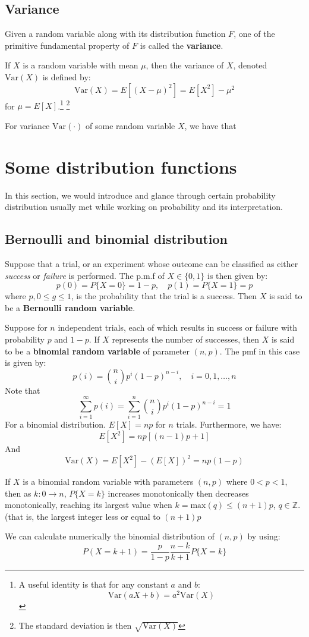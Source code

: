 \subsection{Variance}
Given a random variable along with its distribution function $F$, one of the primitive fundamental property of $F$ is called the \textbf{variance}. 
\begin{definition}[Variance]
    If $X$ is a random variable with mean $\mu$, then the variance of $X$, denoted $\mathrm{Var}(X)$ is defined by: $$\mathrm{Var}(X)=E[(X-\mu)^{2}]=E[X^{2}]-\mu^{2}$$ for $\mu=E[X]$.\footnote{A useful identity is that for any constant $a$ and $b$: $$\mathrm{Var}(aX+b)=a^{2}\mathrm{Var}(X)$$} \footnote{The standard deviation is then $\sqrt{\mathrm{Var}(X)}$}
\end{definition}
\begin{theorem}
    For variance $\mathrm{Var}(\cdot)$ of some random variable $X$, we have that 
\end{theorem}

\section{Some distribution functions}
In this section, we would introduce and glance through certain probability distribution usually met while working on probability and its interpretation.
\subsection{Bernoulli and binomial distribution}
Suppose that a trial, or an experiment whose outcome can be classified as either \textit{success} or \textit{failure} is performed. The p.m.f of $X\in\{ 0,1 \}$ is then given by: $$p(0)=P\{ X=0 \}=1-p,\quad p(1)=P\{ X=1 \}=p$$
where $p,0\leq g\leq 1$, is the probability that the trial is a success. Then $X$ is said to be a \textbf{Bernoulli random variable}. 

Suppose for $n$ independent trials, each of which results in success or failure with probability $p$ and $1-p$. If $X$ represents the number of successes, then $X$ is said to be a \textbf{binomial random variable} of parameter $(n,p)$. The pmf in this case is given by: $$p(i)={n\choose i}p^{i} (1-p)^{n-i},\quad i = 0,1,\dots,n$$
Note that $$\sum^{\infty}_{i=1}p(i)=\sum^{n}_{i=1}{n\choose i}p^{i}(1-p)^{n-i}=1$$
For a binomial distribution. $E[X]=np$ for $n$ trials. Furthermore, we have: $$E[X^{2}]=np[(n-1)p+1]$$
And $$\mathrm{Var}(X)=E[X^{2}]-(E[X])^{2}=np(1-p)$$
\begin{proposition}
    If $X$ is a binomial random variable with parameters $(n,p)$ where $0<p<1$, then as $k:0\to n$, $P\{ X=k \}$ increases monotonically then decreases monotonically, reaching its largest value when $k=\mathrm{max}(q)\leq (n+1)p$, $q\in \mathbb{Z}$. (that is, the largest integer less or equal to $(n+1)p$
\end{proposition}
We can calculate numerically the binomial distribution of $(n,p)$ by using: \begin{equation}
    P(X=k+1)=\frac{p}{1-p} \frac{n-k}{k+1}P\{ X=k \}
\end{equation}
